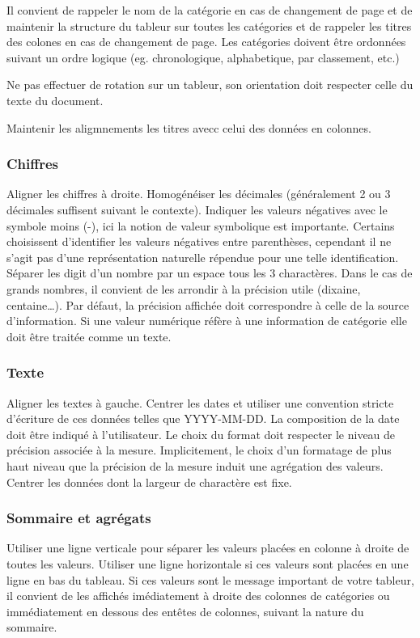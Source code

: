 \documentclass[a4paper,12pt]{article}
\begin{document}
\begin{multicols}{2}
Il convient de rappeler le nom de la catégorie en cas de changement de page et de maintenir la structure du tableur sur toutes les catégories et de rappeler les titres des colones en cas de changement de page.
Les catégories doivent être ordonnées suivant un ordre logique (eg. chronologique, alphabetique, par classement, etc.)

Ne pas effectuer de rotation sur un tableur, son orientation doit respecter celle du texte du document.

Maintenir les aligmnements les titres avecc celui des données en colonnes.
\subsubsection*{Chiffres}
\label{sec:orgd910e72}
Aligner les chiffres à droite.
Homogénéiser les décimales (généralement 2 ou 3 décimales suffisent suivant le contexte).
Indiquer les valeurs négatives avec le symbole \og moins\fg{} (-), ici la notion de valeur symbolique est importante. Certains choisissent d'identifier les valeurs négatives entre parenthèses, cependant il ne s'agit pas d'une représentation naturelle répendue pour une telle identification.
Séparer les digit d'un nombre par un espace tous les 3 charactères. Dans le cas de grands nombres, il convient de les arrondir à la précision utile (dixaine, centaine\ldots{}). Par défaut, la précision affichée doit correspondre à celle de la source d'information.
Si une valeur numérique réfère à une information de catégorie elle doit être traitée comme un texte.
\subsubsection*{Texte}
\label{sec:org6f71d6a}
Aligner les textes à gauche.
Centrer les dates et utiliser une convention stricte d'écriture de ces données telles que \og YYYY-MM-DD\fg{}. \autocite{ISO8601-1DateHeureRepresentations2019} La composition de la date doit être indiqué à l'utilisateur. Le choix du format doit respecter le niveau de précision associée à la mesure. Implicitement, le choix d'un formatage de plus haut niveau que la précision de la mesure induit une agrégation des valeurs.
Centrer les données dont la largeur de charactère est fixe.
\subsubsection*{Sommaire et agrégats}
\label{sec:org90d67f7}
Utiliser une ligne verticale pour séparer les valeurs placées en colonne à droite de toutes les valeurs.
Utiliser une ligne horizontale si ces valeurs sont placées en une ligne en bas du tableau.
Si ces valeurs sont le message important de votre tableur, il convient de les affichés imédiatement à droite des colonnes de catégories ou immédiatement en dessous des entêtes de colonnes, suivant la nature du sommaire.


\end{multicols}
\end{document}
